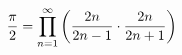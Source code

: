 \documentclass[preview]{standalone}
\begin{document}
\begin{align*}
{\pi \over 2} = \prod_{n=1}^{\infty} \left( {2n \over 2n-1} \cdot {2n \over 2n+1} \right)
\end{align*}
\end{document}
